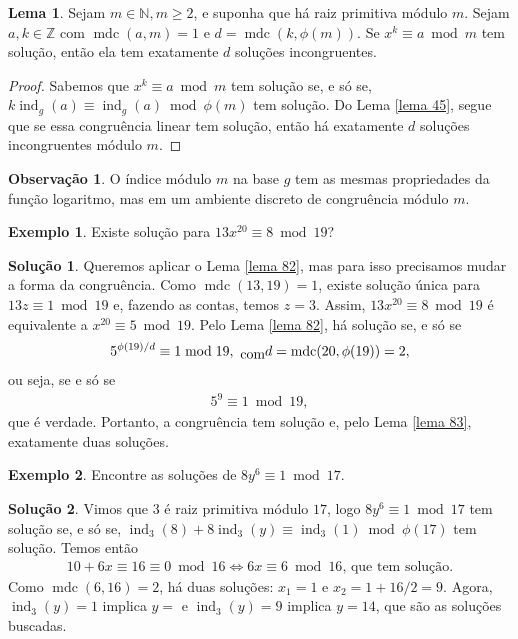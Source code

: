 \documentclass[a4paper,11pt,twoside, leqno]{article}
\DeclareMathOperator{\mdc}{mdc}
\DeclareMathOperator{\ind}{ind}
\theoremstyle{definition}
\newtheorem{lemma}[theorem]{Lema}
\newtheorem{remark}{Observação}[section]
\newtheorem*{example}{Exemplo}
\newtheorem*{solution}{Solução}
\begin{document}
\begin{lemma}
	\label{lema 83}
	Sejam $m\in\mathbb{N}, m\geq 2$, e suponha que há raiz primitiva módulo $m$. Sejam $a,k\in\mathbb{Z}$ com $\mdc(a,m) = 1$ e $d = \mdc(k, \phi(m))$. Se $x^k\equiv a\bmod m$ tem solução, então ela tem exatamente $d$ soluções incongruentes.
\end{lemma}
\begin{proof}
	Sabemos que $x^k\equiv a\bmod m$ tem solução se, e só se, $k\ind_g(a)\equiv\ind_g(a)\bmod\phi(m)$ tem solução. Do Lema \eqref{lema 45}, segue que se essa congruência linear tem solução, então há exatamente $d$ soluções incongruentes módulo $m$.
\end{proof}
\begin{remark}
	O índice módulo $m$ na base $g$ tem as mesmas propriedades da função logaritmo, mas em um ambiente discreto de congruência módulo $m$.
\end{remark}
\begin{example}
	Existe solução para $13x^{20}\equiv 8\bmod 19$?
\end{example}
\begin{solution}
	Queremos aplicar o Lema \eqref{lema 82}, mas para isso precisamos mudar a forma da congruência. Como $\mdc(13, 19)  =1$, existe solução única para $13z\equiv 1\bmod 19$ e, fazendo as contas, temos $z = 3$. Assim, $13x^{20}\equiv 8\bmod 19$ é equivalente a $x^{20}\equiv 5\bmod 19$. Pelo Lema \eqref{lema 82}, há solução se, e só se
	\begin{align*}
	5^{\phi(19)/d}\equiv 1\bmod 19, \txt{ com } d = \mdc(20, \phi(19)) = 2,
	\end{align*}
	ou seja, se e só se
	\begin{align*}
	5^9\equiv 1\bmod 19,
	\end{align*}
	que é verdade. Portanto, a congruência tem solução e, pelo Lema \eqref{lema 83}, exatamente duas soluções.
\end{solution}
\begin{example}
	Encontre as soluções de $8y^6\equiv 1\bmod 17$.
\end{example}
\begin{solution}
	Vimos que $3$ é raiz primitiva módulo $17$, logo $8y^6\equiv 1\bmod 17$ tem solução se, e só se, $\ind_3(8) + 8\ind_3(y)\equiv\ind_3(1)\bmod\phi(17)$ tem solução. Temos então
	\begin{align*}
	10 + 6x\equiv 16\equiv 0\bmod 16 \Longleftrightarrow 6x\equiv 6\bmod 16 \text{, que tem solução}.
	\end{align*}
	Como $\mdc(6,16) = 2$, há duas soluções: $x_1 = 1$ e $x_2 = 1 + 16/2 = 9$. Agora, $\ind_3(y) = 1$ implica $y = $ e $\ind_3(y)=9$ implica $y=14$, que são as soluções buscadas. 
\end{solution}
\end{document}
